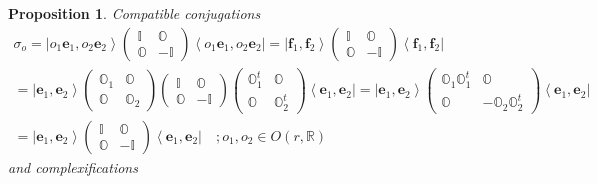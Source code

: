 \documentclass[aps,preprint]{revtex4}
\newtheorem{proposition}[theorem]{Proposition}
\begin{document}
\begin{proposition}
Compatible conjugations 
\begin{gather}
\sigma _{o}=\left\vert o_{1}\mathbf{e}_{1},o_{2}\mathbf{e}_{2}\right\rangle
\left( 
\begin{array}{cc}
\mathbb{I} & \mathbb{O} \\ 
\mathbb{O} & -\mathbb{I}%
\end{array}%
\right) \left\langle o_{1}\mathbf{e}_{1},o_{2}\mathbf{e}_{2}\right\vert
=\left\vert \mathbf{f}_{1},\mathbf{f}_{2}\right\rangle \left( 
\begin{array}{cc}
\mathbb{I} & \mathbb{O} \\ 
\mathbb{O} & -\mathbb{I}%
\end{array}%
\right) \left\langle \mathbf{f}_{1},\mathbf{f}_{2}\right\vert \\
=\left\vert \mathbf{e}_{1},\mathbf{e}_{2}\right\rangle \left( 
\begin{array}{cc}
\mathbb{O}_{1} & \mathbb{O} \\ 
\mathbb{O} & \mathbb{O}_{2}%
\end{array}%
\right) \left( 
\begin{array}{cc}
\mathbb{I} & \mathbb{O} \\ 
\mathbb{O} & -\mathbb{I}%
\end{array}%
\right) \left( 
\begin{array}{cc}
\mathbb{O}_{1}^{t} & \mathbb{O} \\ 
\mathbb{O} & \mathbb{O}_{2}^{t}%
\end{array}%
\right) \left\langle \mathbf{e}_{1},\mathbf{e}_{2}\right\vert =\left\vert 
\mathbf{e}_{1},\mathbf{e}_{2}\right\rangle \left( 
\begin{array}{cc}
\mathbb{O}_{1}\mathbb{O}_{1}^{t} & \mathbb{O} \\ 
\mathbb{O} & -\mathbb{O}_{2}\mathbb{O}_{2}^{t}%
\end{array}%
\right) \left\langle \mathbf{e}_{1},\mathbf{e}_{2}\right\vert \\
=\left\vert \mathbf{e}_{1},\mathbf{e}_{2}\right\rangle \left( 
\begin{array}{cc}
\mathbb{I} & \mathbb{O} \\ 
\mathbb{O} & -\mathbb{I}%
\end{array}%
\right) \left\langle \mathbf{e}_{1},\mathbf{e}_{2}\right\vert \quad
;o_{1},o_{2}\in O\left( r,\mathbb{R}\right)
\end{gather}%
and complexifications 
\begin{equation}

\end{equation}
\end{proposition}
\end{document}
